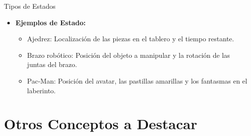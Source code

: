 \documentclass[10pt, envcountsect, handout, aspectratio=1610, hyperref={hypertexnames=true}]{beamer}
\begin{document}
\begin{frame}{Tipos de Estados}
\begin{itemize}
\begin{itemize}
	\end{itemize}
	
  
\item \textbf{Ejemplos de Estado:}
\begin{itemize}
  \item Ajedrez: Localización de las piezas en el tablero y el tiempo restante.
  \item Brazo robótico: Posición del objeto a manipular y la rotación de las juntas del brazo.
  \item Pac-Man: Posición del avatar, las pastillas amarillas y los fantasmas en el laberinto.
\end{itemize}
    
\end{itemize}


\end{frame}





\section{Otros Conceptos a Destacar}
\end{document}
